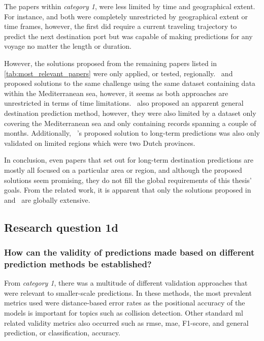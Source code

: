 The papers within \textit{category 1}, were less limited by time and geographical extent. For instance, \cite{Zhang2020AISApproach} and \cite{lechtenberg2019} both were completely unrestricted by geographical extent or time frames, however, the first did require a current traveling trajectory to predict the next destination port but was capable of making predictions for any voyage no matter the length or duration.

However, the solutions proposed from the remaining papers listed in \cref{tab:most_relevant_papers} were only applied, or tested, regionally.~\cite{Rosca2018GrandRoutes} and~\cite{Bachar2018GrandDestination} proposed solutions to the same challenge using the same dataset containing data within the Mediterranean sea, however, it seems as both approaches are unrestricted in terms of time limitations.~\cite{Karatas2020TrajectoryData} also proposed an apparent general destination prediction method, however, they were also limited by a dataset only covering the Mediterranean sea and only containing records spanning a couple of months. Additionally, ~\cite{Dobrkovic2018MaritimeData}'s proposed solution to long-term predictions was also only validated on limited regions which were two Dutch provinces.

In conclusion, even papers that set out for long-term destination predictions are mostly all focused on a particular area or region, and although the proposed solutions seem promising, they do not fill the global requirements of this thesis' goals. From the related work, it is apparent that only the solutions proposed in~\cite{lechtenberg2019} and~\cite{Zhang2020AISApproach} are globally extensive.

\subsection{Research question 1d}
\subsubsection{How can the validity of predictions made based on different prediction methods be established?}

From \textit{category 1}, there was a multitude of different validation approaches that were relevant to smaller-scale predictions. In these methods, the most prevalent metrics used were distance-based error rates as the positional accuracy of the models is important for topics such as collision detection. Other standard \acrshort{ml} related validity metrics also occurred such as \acrfull{rmse}, \acrfull{mae}, F1-score, and general prediction, or classification, accuracy.

